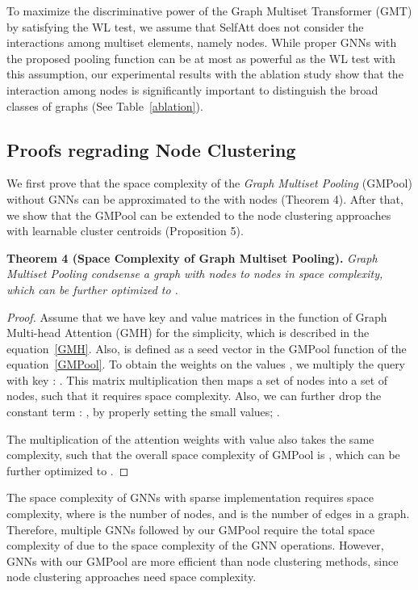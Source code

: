 \documentclass{article} \usepackage{iclr2021_conference,times}
\begin{document}
To maximize the discriminative power of the Graph Multiset Transformer (GMT) by satisfying the WL test, we assume that SelfAtt does not consider the interactions among multiset elements, namely nodes. While proper GNNs with the proposed pooling function can be at most as powerful as the WL test with this assumption, our experimental results with the ablation study show that the interaction among nodes is significantly important to distinguish the broad classes of graphs (See Table~\ref{ablation}).


\subsection{Proofs regrading Node Clustering \label{appendix/clusterproof}}
We first prove that the space complexity of the \emph{Graph Multiset Pooling} (GMPool) without GNNs can be approximated to the  with  nodes (Theorem 4). After that, we show that the GMPool can be extended to the node clustering approaches with learnable cluster centroids (Proposition 5).


\textbf{Theorem 4 (Space Complexity of Graph Multiset Pooling).} \emph{Graph Multiset Pooling condsense a graph with  nodes to  nodes in  space complexity, which can be further optimized to .}

\begin{proof}
Assume that we have key  and value  matrices in the  function of Graph Multi-head Attention (GMH) for the simplicity, which is described in the equation~\ref{GMH}. Also,  is defined as a seed vector  in the GMPool function of the equation~\ref{GMPool}. To obtain the weights on the values , we multiply the query  with key : . This matrix multiplication then maps a set of  nodes into a set of  nodes, such that it requires  space complexity. Also, we can further drop the constant term : , by properly setting the small  values; .

The multiplication of the attention weights  with value  also takes the same complexity, such that the overall space complexity of GMPool is , which can be further optimized to .
\end{proof}

The space complexity of GNNs with sparse implementation requires  space complexity, where  is the number of nodes, and  is the number of edges in a graph. Therefore, multiple GNNs followed by our GMPool require the total space complexity of  due to the space complexity of the GNN operations. However, GNNs with our GMPool are more efficient than node clustering methods, since node clustering approaches need  space complexity.
\end{document}
